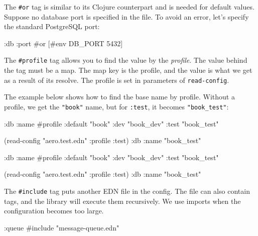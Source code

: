 \fi

The \verb|#or| tag is similar to its Clojure counterpart and is needed for default values. Suppose no database port is specified in the file. To avoid an error, let's specify the standard PostgreSQL port:

\begin{english}
  \begin{clojure}
{:db {:port #or [#env DB_PORT 5432]}}
  \end{clojure}
\end{english}


The \verb|#profile| tag allows you to find the value by the \emph{profile}. The value behind the tag must be a map. The map key is the profile, and the value is what we get as a result of its resolve. The profile is set in parameters of \verb|read-config|.

The example below shows how to find the base name by profile. Without a profile, we get the \verb|"book"| name, but for \verb|:test|, it becomes \verb|"book_test"|:

\ifx\DEVICETYPE\MOBILE

\begin{english}
  \begin{clojure}
{:db
 {:name
  #profile {:default "book"
            :dev     "book_dev"
            :test    "book_test"}}}

(read-config "aero.test.edn"
  {:profile :test})
{:db {:name "book_test"}}
  \end{clojure}
\end{english}

\else

\begin{english}
  \begin{clojure}
{:db {:name #profile {:default "book"
                      :dev     "book_dev"
                      :test    "book_test"}}}

(read-config "aero.test.edn" {:profile :test})
{:db {:name "book_test"}}
  \end{clojure}
\end{english}

\fi

The \verb|#include| tag puts another EDN file in the config. The file can also contain tags, and the library will execute them recursively. We use imports when the configuration becomes too large.

\begin{english}
  \begin{clojure}
{:queue #include "message-queue.edn"}
  \end{clojure}
\end{english}

